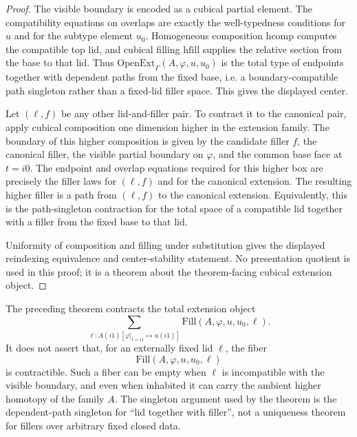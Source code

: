 \documentclass{lmcs}
\newcommand{\hcomp}{\mathrm{hcomp}}
\newcommand{\hfillop}{\mathrm{hfill}}
\newcommand{\OpenExt}{\mathrm{OpenExt}}
\begin{document}
\begin{proof}
The visible boundary is encoded as a cubical partial element.  The compatibility equations on
overlaps are exactly the well-typedness conditions for \(u\) and for the subtype element
\(u_0\).  Homogeneous composition \(\hcomp\) computes the compatible top lid, and cubical
filling \(\hfillop\) supplies the relative section from the base to that lid.  Thus
\(\OpenExt_\Gamma(A,\varphi,u,u_0)\) is the total type of endpoints together with dependent
paths from the fixed base, i.e. a boundary-compatible path singleton rather than a fixed-lid
filler space.  This gives the displayed center.

Let \((\ell,f)\) be any other lid-and-filler pair.  To contract it to the canonical pair, apply
cubical composition one dimension higher in the extension family.  The boundary of this
higher composition is given by the candidate filler \(f\), the canonical filler, the visible
partial boundary on \(\varphi\), and the common base face at \(t=i0\).  The endpoint and
overlap equations required for this higher box are precisely the filler laws for \((\ell,f)\)
and for the canonical extension.  The resulting higher filler is a path from \((\ell,f)\) to
the canonical extension.  Equivalently, this is the path-singleton contraction for the total
space of a compatible lid together with a filler from the fixed base to that lid.

Uniformity of composition and filling under substitution gives the displayed reindexing
equivalence and center-stability statement.  No presentation quotient is used in this proof;
it is a theorem about the theorem-facing cubical extension object.
\end{proof}

\begin{rem}
\label{rem:fixed-lid-fibers}
The preceding theorem contracts the total extension object
\[
  \sum_{\ell:A(i1)[\varphi|_{t=i1}\mapsto u(i1)]}
  \mathrm{Fill}(A,\varphi,u,u_0,\ell).
\]
It does not assert that, for an externally fixed lid \(\ell\), the fiber
\[
  \mathrm{Fill}(A,\varphi,u,u_0,\ell)
\]
is contractible.  Such a fiber can be empty when \(\ell\) is incompatible with the visible
boundary, and even when inhabited it can carry the ambient higher homotopy of the family
\(A\).  The singleton argument used by the theorem is the dependent-path singleton for
``lid together with filler'', not a uniqueness theorem for fillers over arbitrary fixed
closed data.
\end{rem}
\end{document}
